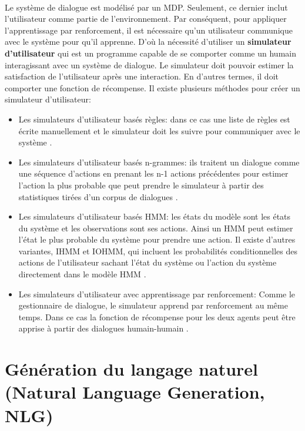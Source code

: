 \paragraph{}\label{usersim}
Le système de dialogue est modélisé par un MDP. Seulement, ce dernier inclut l'utilisateur comme partie de l'environnement. Par conséquent, pour appliquer l'apprentissage par renforcement, il est nécessaire qu'un utilisateur communique avec le système pour qu'il apprenne. D'où la nécessité d'utiliser un \textbf{simulateur d'utilisateur} qui est un programme capable de se comporter comme un humain interagissant avec un système de dialogue. Le simulateur doit pouvoir estimer la satisfaction de l'utilisateur après une interaction. En d'autres termes, il doit comporter une fonction de récompense. Il existe plusieurs méthodes pour créer un simulateur d'utilisateur:
\begin{itemize}
	\item Les simulateurs d'utilisateur basés règles: dans ce cas une liste de règles est écrite manuellement et le simulateur doit les suivre pour communiquer avec le système \citep{Schatzmann2007}.
	\item Les simulateurs d'utilisateur basés n-grammes: ils traitent un dialogue comme une séquence d'actions en prenant les n-1 actions précédentes pour estimer l'action la plus probable que peut prendre le simulateur à partir des statistiques tirées d'un corpus de dialogues \citep{Georgila2005}.
	\item Les simulateurs d'utilisateur basés HMM: les états du modèle sont les états du système et les observations sont ses actions. Ainsi un HMM peut estimer l'état le plus probable du système pour prendre une action. Il existe d'autres variantes, IHMM et IOHMM, qui incluent les probabilités conditionnelles des actions de l'utilisateur sachant l'état du système ou l'action du système directement dans le modèle HMM \citep{Cuayhuitl2005}.
	\item Les simulateurs d'utilisateur avec apprentissage par renforcement: Comme le gestionnaire de dialogue, le simulateur apprend par renforcement au même temps. Dans ce cas la fonction de récompense pour les deux agents peut être apprise à partir des dialogues humain-humain \citep{Chandramohan2011}.
\end{itemize}







\section{Génération du langage naturel (Natural Language Generation, NLG)}\label{NLG}
